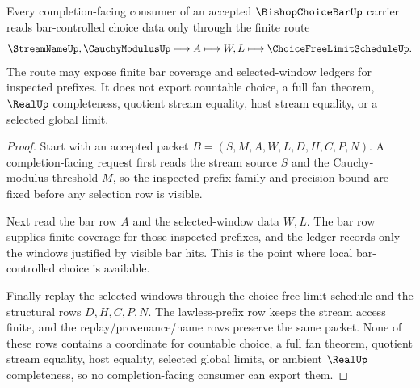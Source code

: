 \begin{theorem}
\label{thm:bishop-choice-bar-l10-dependency-route}
Every completion-facing consumer of an accepted $\BishopChoiceBarUp$ carrier reads bar-controlled choice data only through the finite route
$$
\StreamNameUp,\CauchyModulusUp \longmapsto A \longmapsto W,L \longmapsto \ChoiceFreeLimitScheduleUp .
$$
The route may expose finite bar coverage and selected-window ledgers for inspected prefixes. It does not export countable choice, a full fan theorem, $\RealUp$ completeness, quotient stream equality, host stream equality, or a selected global limit.
\end{theorem}
\begin{proof}
Start with an accepted packet $B=(S,M,A,W,L,D,H,C,P,N)$. A completion-facing request first reads the stream source $S$ and the Cauchy-modulus threshold $M$, so the inspected prefix family and precision bound are fixed before any selection row is visible.

Next read the bar row $A$ and the selected-window data $W,L$. The bar row supplies finite coverage for those inspected prefixes, and the ledger records only the windows justified by visible bar hits. This is the point where local bar-controlled choice is available.

Finally replay the selected windows through the choice-free limit schedule and the structural rows $D,H,C,P,N$. The lawless-prefix row keeps the stream access finite, and the replay/provenance/name rows preserve the same packet. None of these rows contains a coordinate for countable choice, a full fan theorem, quotient stream equality, host equality, selected global limits, or ambient $\RealUp$ completeness, so no completion-facing consumer can export them.
\end{proof}



